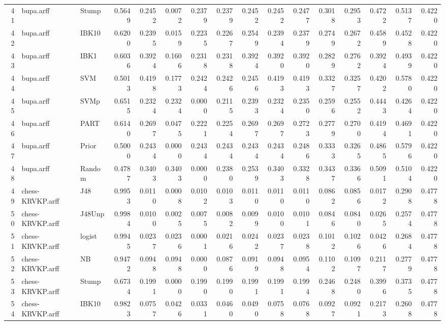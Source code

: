 \documentclass {article}
\begin{document}
\begin{table}[ht]
\begin{tabular}{rllrrrrrrrrrrrrr}
  41 & bupa.arff & Stump & 0.5649 & 0.2452 & 0.0072 & 0.2379 & 0.2379 & 0.2452 & 0.2452 & 0.2477 & 0.3018 & 0.2953 & 0.4722 & 0.5137 & 0.4220 \\ 
  42 & bupa.arff & IBK10 & 0.6200 & 0.2395 & 0.0159 & 0.2235 & 0.2267 & 0.2549 & 0.2394 & 0.2379 & 0.2749 & 0.2672 & 0.4589 & 0.4528 & 0.4220 \\ 
  43 & bupa.arff & IBK1 & 0.6036 & 0.3924 & 0.1606 & 0.2318 & 0.2318 & 0.3924 & 0.3920 & 0.3920 & 0.2829 & 0.2762 & 0.3924 & 0.4939 & 0.4220 \\ 
  44 & bupa.arff & SVM & 0.5013 & 0.4198 & 0.1773 & 0.2424 & 0.2426 & 0.2456 & 0.4193 & 0.4193 & 0.3327 & 0.3257 & 0.4202 & 0.5780 & 0.4220 \\ 
  45 & bupa.arff & SVMp & 0.6515 & 0.2324 & 0.2324 & 0.0000 & 0.2115 & 0.2393 & 0.2324 & 0.2350 & 0.2596 & 0.2552 & 0.4443 & 0.4264 & 0.4220 \\ 
  46 & bupa.arff & PART & 0.6140 & 0.2697 & 0.0475 & 0.2221 & 0.2254 & 0.2697 & 0.2697 & 0.2723 & 0.2779 & 0.2700 & 0.4194 & 0.4691 & 0.4220 \\ 
  47 & bupa.arff & Prior & 0.5000 & 0.2434 & 0.0000 & 0.2434 & 0.2434 & 0.2434 & 0.2434 & 0.2486 & 0.3333 & 0.3265 & 0.4865 & 0.5796 & 0.4220 \\ 
  48 & bupa.arff & Random & 0.4787 & 0.3403 & 0.3403 & 0.0000 & 0.2380 & 0.2539 & 0.3403 & 0.3328 & 0.3437 & 0.3366 & 0.5091 & 0.5104 & 0.4220 \\ 
  49 & chess-KRVKP.arff & J48 & 0.9953 & 0.0110 & 0.0008 & 0.0102 & 0.0103 & 0.0110 & 0.0110 & 0.0110 & 0.0862 & 0.0856 & 0.0172 & 0.2908 & 0.4778 \\ 
  50 & chess-KRVKP.arff & J48Unp & 0.9984 & 0.0100 & 0.0025 & 0.0075 & 0.0082 & 0.0099 & 0.0100 & 0.0101 & 0.0846 & 0.0840 & 0.0265 & 0.2574 & 0.4778 \\ 
  51 & chess-KRVKP.arff & logist & 0.9945 & 0.0237 & 0.0236 & 0.0001 & 0.0216 & 0.0242 & 0.0237 & 0.0238 & 0.1012 & 0.1026 & 0.0426 & 0.2684 & 0.4778 \\ 
  52 & chess-KRVKP.arff & NB & 0.9472 & 0.0948 & 0.0948 & 0.0000 & 0.0876 & 0.0919 & 0.0948 & 0.0954 & 0.1102 & 0.1097 & 0.2117 & 0.2779 & 0.4778 \\ 
  53 & chess-KRVKP.arff & Stump & 0.6734 & 0.1991 & 0.0000 & 0.1990 & 0.1990 & 0.1991 & 0.1991 & 0.1994 & 0.2468 & 0.2480 & 0.3996 & 0.3735 & 0.4778 \\ 
  54 & chess-KRVKP.arff & IBK10 & 0.9823 & 0.0757 & 0.0426 & 0.0331 & 0.0460 & 0.0490 & 0.0758 & 0.0768 & 0.0927 & 0.0921 & 0.2173 & 0.2608 & 0.4778 \\ 

\end{tabular}
\end{table}
\end{document}
